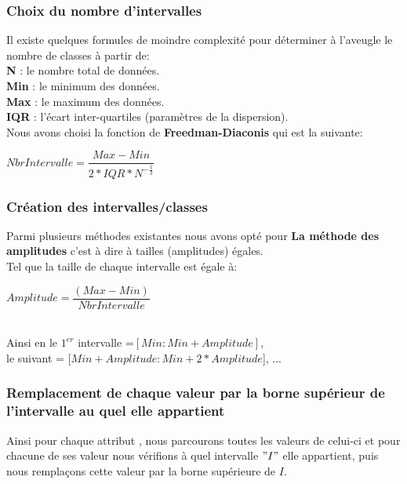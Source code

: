 \documentclass[12pt,a4paper,oneside]{book}
\begin{document}
	\subsubsection{Choix du nombre d'intervalles}
	
	Il existe quelques formules de moindre complexité pour déterminer à l'aveugle le nombre de classes à partir de:\\
	\textbf{N} : le nombre total de données.\\
	\textbf{Min} : le minimum des données.\\
	\textbf{Max} : le maximum des données.\\
	\textbf{IQR} : l'écart inter-quartiles (paramètres de la dispersion).\\
	
	Nous avons choisi la fonction de \textbf{Freedman-Diaconis} qui est la suivante:
	\begin{center}
		$NbrIntervalle = \dfrac{Max - Min}{2 * IQR * N^{-\frac{1}{3}}}$
	\end{center}
	
	
	\subsubsection{Création des intervalles/classes}
	
	Parmi plusieurs méthodes existantes nous avons opté pour \textbf{ La méthode des amplitudes} c'est à dire à tailles (amplitudes) égales.\\
	Tel que la taille de chaque intervalle est égale à:
	\begin{center}
		$Amplitude = \dfrac{(Max - Min)}{NbrIntervalle} $\\
	\end{center}
	
	\textbf{ }\\
	Ainsi en le $1^{er}$ intervalle =$[Min : Min+Amplitude]$,\\
	le suivant = [$Min+Amplitude : Min+2*Amplitude$], ... 
	
	
	\subsubsection{Remplacement de chaque valeur par la borne supérieur de l'intervalle au quel elle appartient}
	
	Ainsi pour chaque attribut , nous parcourons toutes les valeurs de celui-ci et pour chacune de ses valeur nous vérifions à quel intervalle $"I"$ elle appartient, puis nous remplaçons cette valeur par la borne supérieure de $I$.\\
	
\end{document}
